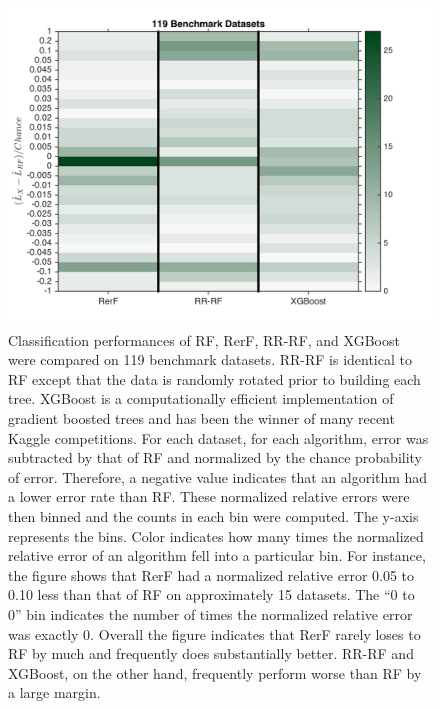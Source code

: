 \documentclass[simplex.tex]{subfiles}
\begin{document}
\begin{figure}[h!]
\begin{cframed}
\centering
\includegraphics[height=0.5\textheight]{../../figs/rerF_benchmark.png}
\caption{
Classification performances of RF, RerF, RR-RF, and XGBoost were
compared on 119 benchmark datasets. RR-RF is identical to RF except that
the data is randomly rotated prior to building each tree. XGBoost is a
computationally efficient implementation of gradient boosted trees and
has been the winner of many recent Kaggle competitions. For each
dataset, for each algorithm, error was subtracted by that of RF and
normalized by the chance probability of error. Therefore, a negative
value indicates that an algorithm had a lower error rate than RF. These
normalized relative errors were then binned and the counts in each bin
were computed. The y-axis represents the bins. Color indicates how many
times the normalized relative error of an algorithm fell into a
particular bin. For instance, the figure shows that RerF had a
normalized relative error 0.05 to 0.10 less than that of RF on
approximately 15 datasets. The ``0 to 0'' bin indicates the number of
times the normalized relative error was exactly 0. Overall the figure
indicates that RerF rarely loses to RF by much and frequently does
substantially better. RR-RF and XGBoost, on the other hand, frequently
perform worse than RF by a large margin.
}
\label{fig:RefF3}
\end{cframed}
\end{figure}

\end{document}
